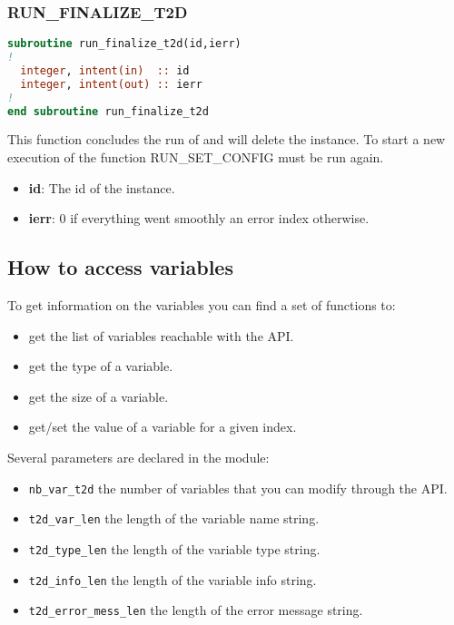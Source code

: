 \subsubsection{RUN\_FINALIZE\_T2D}
%
\begin{lstlisting}[language=Fortran]
subroutine run_finalize_t2d(id,ierr)    
!
  integer, intent(in)  :: id
  integer, intent(out) :: ierr
!
end subroutine run_finalize_t2d
\end{lstlisting}
This function concludes the run of  and will delete the instance. To
start a new execution of  the function RUN\_SET\_CONFIG must be run again.
\begin{itemize}
\item \textbf{id}: The id of the instance.
\item \textbf{ierr}: 0 if everything went smoothly an error index otherwise.
\end{itemize}
%
\subsection{How to access variables}
%
To get information on the variables you can find a set of functions to:
\begin{itemize}
\item get the list of variables reachable with the API.
\item get the type of a variable.
\item get the size of a variable.
\item get/set the value of a variable for a given index.
\end{itemize}
%
Several parameters are declared in the module:
\begin{itemize}
\item \verb!nb_var_t2d! the number of variables that you can modify through the
API.
\item \verb!t2d_var_len! the length of the variable name string.
\item \verb!t2d_type_len! the length of the variable type string.
\item \verb!t2d_info_len! the length of the variable info string.
\item \verb!t2d_error_mess_len! the length of the error message string.
\end{itemize}
%
